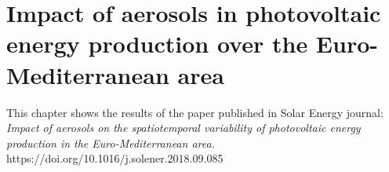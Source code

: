 \begin{subappendices}



\end{subappendices}

\clearpage


\chapter{Impact of aerosols in photovoltaic energy production over the Euro-Mediterranean area}

\blfootnote
{This chapter shows the results of the paper published in Solar Energy journal: \textit{Impact of aerosols on the spatiotemporal variability of photovoltaic energy production in the Euro-Mediterranean area.}\\
https://doi.org/10.1016/j.solener.2018.09.085}


